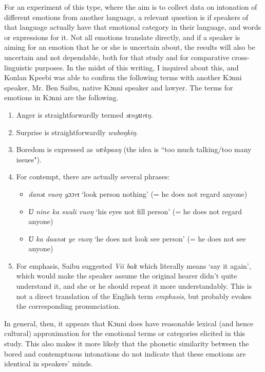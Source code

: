 \documentclass[output=paper]{langsci/langscibook}
\begin{document}
For an experiment of this type, where the aim is to collect data on intonation of different emotions from another language, a relevant question is if speakers of that language actually have that emotional category in their language, and words or expressions for it. Not all emotions translate directly, and if a speaker is aiming for an emotion that he or she is uncertain about, the results will also be uncertain and not dependable, both for that study and for comparative cross-linguistic purposes. In the midst of this writing, I inquired about this, and Konlan Kpeebi was able to confirm the following terms with another Kɔnni speaker, Mr. Ben Saibu, native Kɔnni speaker and lawyer. The terms for emotions in Kɔnni are the following.


\begin{enumerate}
\item Anger is straightforwardly termed \emph{sɩnyɩɩrɩŋ}.
\item Surprise is straightforwardly \emph{wuboŋkiŋ}. 
\item Boredom is expressed as \emph{wʋkpaaŋ} (the idea is ``too much talking/too many issues").
\item For contempt, there are actually several phrases: 

\begin{itemize}[noitemsep]
\item \emph{dansɩ vuoŋ yɔɔrɩ} `look person nothing' (= he does not regard anyone) 
\item \emph{Ʋ nine ka suuli vuoŋ} `his eyes not fill person' (= he does not regard anyone) 
\item \emph{Ʋ ka daansɩ ye vuoŋ} `he does not look see person' (= he does not see anyone)
\end{itemize}
\item For emphasis, Saibu suggested \textit{Vii balɩ} which literally means `say it again', which would make the speaker assume the original hearer didn't quite understand it, and she or he should repeat it more understandably. This is not a direct translation of the English term \emph{emphasis}, but probably evokes the corresponding pronunciation.
\end{enumerate}

In general, then, it appears that Kɔnni does have reasonable lexical (and hence cultural) approximation for the emotional terms or categories elicited in this study. This also makes it more likely that the phonetic similarity between the bored and contemptuous intonations do not indicate that these emotions are identical in speakers' minds. 
\end{document}
